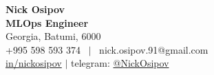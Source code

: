 \documentclass[letterpaper,12pt]{fed-res} %
\begin{document}
\begin{center}
    \textbf{\Huge Nick Osipov} \\ \vspace{1pt}
    \textbf{MLOps Engineer} \\ \vspace{1pt}
    Georgia, Batumi, 6000 \\ \vspace{1pt}
    +995 598 593 374 \ $|$ \ nick.osipov.91@gmail.com \\ \vspace{1pt}
    \href{https://www.linkedin.com/in/nickosipov/}{in/nickosipov} $|$ telegram: \href{https://t.me/NickOsipov}{@NickOsipov} \\ \vspace{1pt}
\end{center}







\end{document}
